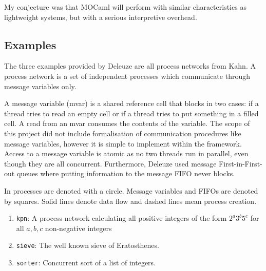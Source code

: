 \documentclass[12pt,twoside,notitlepage]{report}
\theoremstyle{plain}%
\theoremstyle{definition}
\theoremstyle{remark}
\begin{document}
My conjecture was that MOCaml will perform with similar characteristics as lightweight systems, but with a serious interpretive overhead.
\subsection{Examples}
The three examples provided by Deleuze are all process networks from Kahn\cite{kahn1976coroutines}. A process network is a set of independent processes which communicate through message variables only. 

A message variable (mvar) is a shared reference cell that blocks in two cases: if a thread tries to read an empty cell or if a thread tries to put something in a filled cell. A read from an mvar consumes the contents of the variable. The scope of this project did not include formalisation of communication procedures like message variables, however it is simple to implement within the framework. Access to a message variable is atomic as no two threads run in parallel, even though they are all concurrent. Furthermore, Deleuze used message First-in-First-out queues where putting information to the message FIFO never blocks. 

In  processes are denoted with a circle. Message variables and FIFOs are denoted by squares. Solid lines denote data flow and dashed lines mean process creation.
\begin{enumerate}
\item{\verb|kpn|: A process network calculating all positive integers of the form $ 2^a3^b5^c $ for all $ a,b,c $ non-negative integers}
\item{\verb|sieve|: The well known sieve of Eratosthenes.}
\item{\verb|sorter|: Concurrent sort of a list of integers.}
\end{enumerate}
\end{document}
